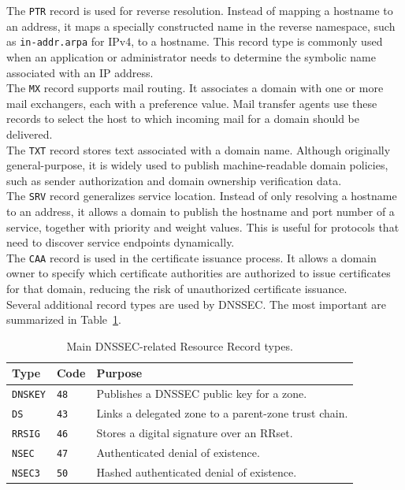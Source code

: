 \documentclass{scrbook}
\begin{document}
	The \texttt{PTR} record is used for reverse resolution. Instead of mapping a hostname to an address, it maps a specially constructed name in the reverse namespace, such as \texttt{in-addr.arpa} for IPv4, to a hostname. This record type is commonly used when an application or administrator needs to determine the symbolic name associated with an IP address.\\
	
	The \texttt{MX} record supports mail routing. It associates a domain with one or more mail exchangers, each with a preference value. Mail transfer agents use these records to select the host to which incoming mail for a domain should be delivered.\\
	
	The \texttt{TXT} record stores text associated with a domain name. Although originally general-purpose, it is widely used to publish machine-readable domain policies, such as sender authorization and domain ownership verification data.\\
	
	The \texttt{SRV} record generalizes service location. Instead of only resolving a hostname to an address, it allows a domain to publish the hostname and port number of a service, together with priority and weight values. This is useful for protocols that need to discover service endpoints dynamically.\\
	
	The \texttt{CAA} record is used in the certificate issuance process. It allows a domain owner to specify which certificate authorities are authorized to issue certificates for that domain, reducing the risk of unauthorized certificate issuance.\\
	
	Several additional record types are used by DNSSEC. The most important are summarized in Table~\ref{tab:dnssec-record-types}.
	
	\begin{table}[!h]
		\centering
		\begin{tabular}{lll}
			\hline
			\textbf{Type} & \textbf{Code} & \textbf{Purpose} \\
			\hline
			\texttt{DNSKEY} & \texttt{48} & Publishes a DNSSEC public key for a zone. \\
			\texttt{DS} & \texttt{43} & Links a delegated zone to a parent-zone trust chain. \\
			\texttt{RRSIG} & \texttt{46} & Stores a digital signature over an RRset. \\
			\texttt{NSEC} & \texttt{47} & Authenticated denial of existence. \\
			\texttt{NSEC3} & \texttt{50} & Hashed authenticated denial of existence. \\
			\hline
		\end{tabular}
		\caption{Main DNSSEC-related Resource Record types.}
		\label{tab:dnssec-record-types}
	\end{table}
	
\end{document}
